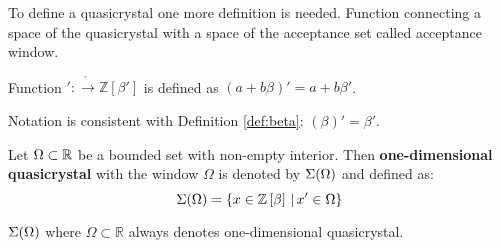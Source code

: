 \documentclass[text.tex]{subfiles}
\begin{document}
To define a quasicrystal one more definition is needed. Function connecting a space of the quasicrystal with a space of the acceptance set called acceptance window.

\begin{definition}
Function $':\ring\to\mathbb{Z}[\beta']$ is defined as $(a+b\beta)' = a+b\beta'$.
\end{definition}
\begin{remark}
Notation is consistent with Definition \ref{def:beta}: $(\beta)'=\beta'$.
\end{remark}

\begin{definition}
\label{def_oneDimension}
Let $\Omega \subset \mathbb{R}$ be a bounded set with non-empty interior. Then \textbf{one-dimensional quasicrystal} with the window $\Omega$ is denoted by $\Sigma(\Omega)$ and defined as:
$$\Sigma(\Omega) = \{ x\in \mathbb{Z}\left[\beta\right] \,|\, x'\in \Omega\}$$
\end{definition}

\begin{remark}
$\Sigma(\Omega)$ where $\Omega \subset \mathbb{R}$ always denotes one-dimensional quasicrystal.
\end{remark}
\end{document}
